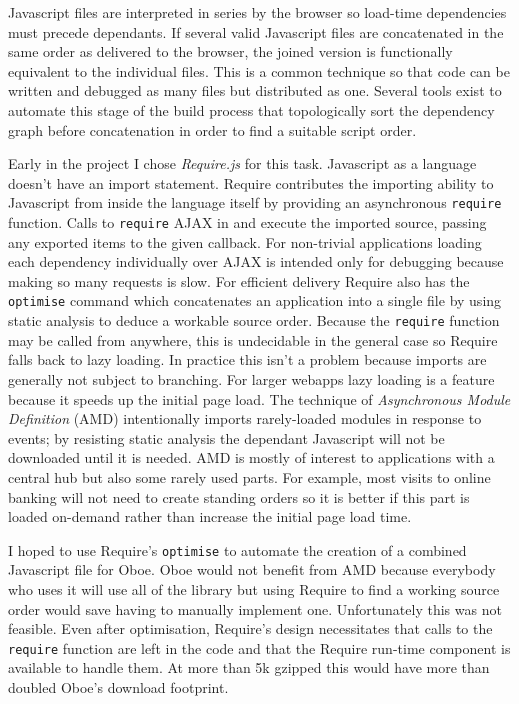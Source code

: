 \documentclass[]{article}
\begin{document}
Javascript files are interpreted in series by the browser so load-time
dependencies must precede dependants. If several valid Javascript files
are concatenated in the same order as delivered to the browser, the
joined version is functionally equivalent to the individual files. This
is a common technique so that code can be written and debugged as many
files but distributed as one. Several tools exist to automate this stage
of the build process that topologically sort the dependency graph before
concatenation in order to find a suitable script order.

Early in the project I chose \emph{Require.js} for this task. Javascript
as a language doesn't have an import statement. Require contributes the
importing ability to Javascript from inside the language itself by
providing an asynchronous \texttt{require} function. Calls to
\texttt{require} AJAX in and execute the imported source, passing any
exported items to the given callback. For non-trivial applications
loading each dependency individually over AJAX is intended only for
debugging because making so many requests is slow. For efficient
delivery Require also has the \texttt{optimise} command which
concatenates an application into a single file by using static analysis
to deduce a workable source order. Because the \texttt{require} function
may be called from anywhere, this is undecidable in the general case so
Require falls back to lazy loading. In practice this isn't a problem
because imports are generally not subject to branching. For larger
webapps lazy loading is a feature because it speeds up the initial page
load. The technique of \emph{Asynchronous Module Definition} (AMD)
intentionally imports rarely-loaded modules in response to events; by
resisting static analysis the dependant Javascript will not be
downloaded until it is needed. AMD is mostly of interest to applications
with a central hub but also some rarely used parts. For example, most
visits to online banking will not need to create standing orders so it
is better if this part is loaded on-demand rather than increase the
initial page load time.

I hoped to use Require's \texttt{optimise} to automate the creation of a
combined Javascript file for Oboe. Oboe would not benefit from AMD
because everybody who uses it will use all of the library but using
Require to find a working source order would save having to manually
implement one. Unfortunately this was not feasible. Even after
optimisation, Require's design necessitates that calls to the
\texttt{require} function are left in the code and that the Require
run-time component is available to handle them. At more than 5k gzipped
this would have more than doubled Oboe's download footprint.
\end{document}

